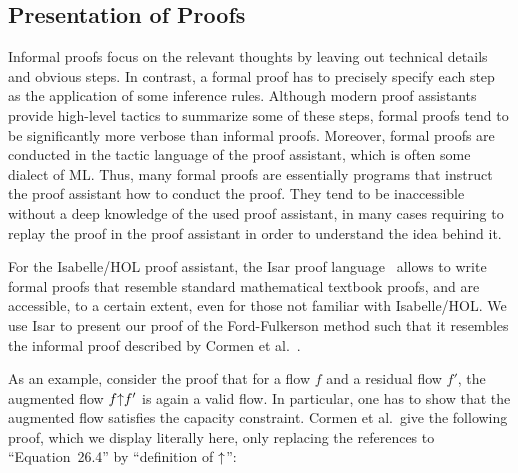 \documentclass{llncs}
\begin{document}
\subsection{Presentation of Proofs}
Informal proofs focus on the relevant thoughts by leaving out technical details and obvious steps. 
In contrast, a formal proof has to precisely specify each step as the application of some inference rules. 
Although modern proof assistants provide high-level tactics to summarize some of these steps, formal proofs tend to be significantly more 
verbose than informal proofs. Moreover, formal proofs are conducted in the tactic language of the proof assistant, which is often some dialect of ML. 
Thus, many formal proofs are essentially programs that instruct the proof assistant how to conduct the proof. They tend to be inaccessible without a deep knowledge of the used proof assistant, in many cases requiring to replay the proof in the proof assistant in order to understand the idea behind it.

For the Isabelle/HOL proof assistant, the Isar proof language~\cite{Wenzel99} allows to write formal proofs that resemble standard mathematical textbook proofs, and are accessible, to a certain extent, even for those not familiar with Isabelle/HOL. 
We use Isar to present our proof of the Ford-Fulkerson method such that it resembles the informal proof described by Cormen et al.~\cite{CLRS09}.

As an example, consider the proof that for a flow $f$ and a residual flow $f'$, the augmented flow $f{\mathbin\uparrow} f'$ is again a valid flow. In particular, one has to show 
that the augmented flow satisfies the capacity constraint. Cormen et al.~give the following proof, which we display literally here, only replacing the references to 
``Equation~26.4'' by ``definition of ${\mathbin\uparrow}$'':
\end{document}
